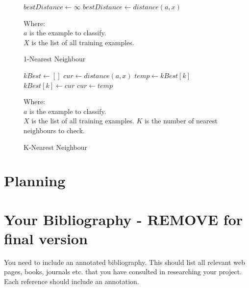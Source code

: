\documentclass[11pt,fleqn,twoside]{article}
\begin{document}
\begin{figure}
\begin{algorithmic}
\State $bestDistance \gets \infty$
		\State $bestDistance \gets distance(a, x)$
	\EndIf
\EndFor
\end{algorithmic}

Where:\\
\(a\) is the example to classify.\\
\(X\) is the list of all training examples.
\caption{1-Nearest Neighbour}
\label{fig:1-nn}
\end{figure}

\begin{figure}
\begin{algorithmic}
\State $kBest \gets []$
	\State $cur \gets distance(a, x)$
			\State $temp \gets kBest[k]$
			\State $kBest[k] \gets cur$
			\State $cur \gets temp$
		\EndIf
	\EndFor
\EndFor
\end{algorithmic}
Where:\\
$a$ is the example to classify.\\
$X$ is the list of all training examples.
$K$ is the number of nearest neighbours to check.
\caption{K-Nearest Neighbour}
\label{fig:k-nn}
\end{figure}

\section{Planning}

%
%
\section*{Your Bibliography - REMOVE for final version}
%
You need to include an annotated bibliography. This should list all relevant web pages, books, journals etc. that you have consulted in researching your project. Each reference should include an annotation. 
\end{document}
